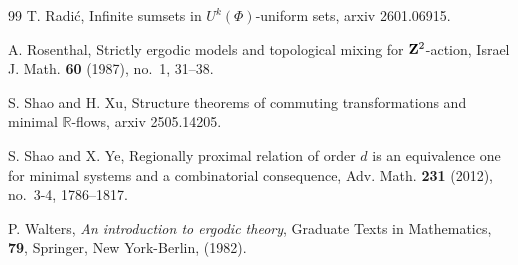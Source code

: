 \documentclass[12pt]{amsart}
\theoremstyle{definition}
\theoremstyle{plain}
\theoremstyle{definition}
\numberwithin{equation}{section}
\begin{document}
\begin{thebibliography}{99}
 T. Radi\'c, Infinite sumsets in $U^k(\Phi)$-uniform sets, arxiv 2601.06915.

A. Rosenthal, Strictly ergodic models and topological mixing for ${\bf Z}^2$-action, Israel J. Math. {\bf 60} (1987), no.~1, 31--38.

S. Shao and H. Xu, Structure theorems of commuting transformations and minimal $\mathbb{R}$-flows, arxiv 2505.14205.

S. Shao and X. Ye, Regionally proximal relation of order $d$ is an equivalence one for minimal systems and a combinatorial consequence, Adv. Math. {\bf 231} (2012), no.~3-4, 1786--1817.

P. Walters, {\it An introduction to ergodic theory}, Graduate Texts in Mathematics, \textbf{79}, Springer, New York-Berlin, (1982).








\end{thebibliography}
\end{document}
